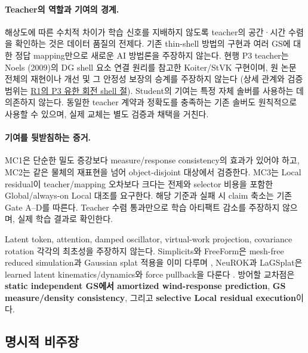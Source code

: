 \documentclass[11pt]{article}
\begin{document}
\paragraph{Teacher의 역할과 기여의 경계.}
해상도에 따른 수치적 차이가 학습 신호를 지배하지 않도록 teacher의 공간·시간 수렴을 확인하는 것은
데이터 품질의 전제다. 기존 thin-shell 방법의 구현과 여러 GS에 대한 정답 mapping만으로 새로운 AI
방법론을 주장하지 않는다. 현행 P3 teacher는 Noels (2009)의 DG shell 요소 연결 원리를 참고한
Koiter/StVK 구현이며, 원 논문 전체의 재현이나 개선 및 그 안정성 보장의 승계를 주장하지 않는다
(상세 관계와 검증 범위는 \href{development/r1_teacher_probe_oracle.pdf}{R1의 P3 유한 회전 shell 절}).
Student의 기여는 특정 자체 솔버를 사용하는 데 의존하지 않는다. 동일한 teacher 계약과 정확도를
충족하는 기존 솔버도 원칙적으로 사용할 수 있으며, 실제 교체는 별도 검증과 채택을 거친다.

\paragraph{기여를 뒷받침하는 증거.}
MC1은 단순한 밀도 증강보다 measure/response consistency의 효과가 있어야 하고,
MC2는 같은 물체의 재표현을 넘어 object-disjoint 대상에서 검증한다.
MC3는 Local residual이 teacher/mapping 오차보다 크다는 전제와 selector 비용을 포함한
Global/always-on Local 대조를 요구한다. 해당 기준과 실패 시 claim 축소는 기존 Gate A--D를 따른다.
Teacher 수렴 통과만으로 학습 아티팩트 감소를 주장하지 않으며, 실제 학습 결과로 확인한다.

Latent token, attention, damped oscillator, virtual-work projection, covariance rotation 각각의 최초성을 주장하지 않는다.
Simplicits와 FreeForm은 mesh-free reduced simulation과 Gaussian splat 적용을 이미 다루며
\cite{modi2024simplicits,xiang2026freeform}, NeuROK과 LaGSplat은 learned latent kinematics/dynamics와
force pullback을 다룬다 \cite{geng2026neurok,pottier2026lagsplat}.
방어할 교차점은 \textbf{static independent GS에서 amortized wind-response prediction},
\textbf{GS measure/density consistency}, 그리고 \textbf{selective Local residual execution}이다.

\subsection{명시적 비주장}
\end{document}
